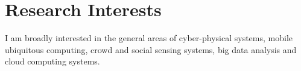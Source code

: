 
\section{\sc Research Interests}

I am broadly interested in the general areas of cyber-physical systems, mobile ubiquitous computing, crowd and social sensing systems, big data analysis and cloud computing systems.



